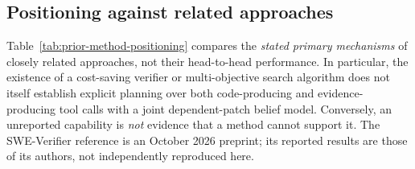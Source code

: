 \documentclass[pdflatex,sn-basic]{sn-jnl}
\begin{document}
\subsection{Positioning against related approaches}
\label{sec:method-comparison}
Table~\ref{tab:prior-method-positioning} compares the \emph{stated
primary mechanisms} of closely related approaches, not their
head-to-head performance. In particular, the existence of a
cost-saving verifier or multi-objective search algorithm does
not itself establish explicit planning over both
code-producing and evidence-producing tool calls with a
joint dependent-patch belief model. Conversely, an
unreported capability is \emph{not} evidence that a method
cannot support it. The SWE-Verifier reference is an
October 2026 preprint; its reported results are those
of its authors, not independently reproduced here.
\end{document}
